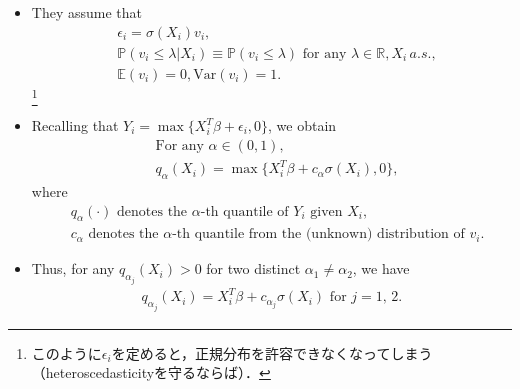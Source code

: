 \documentclass[xcolor=svgnames,dvipdfmx,cjk]{beamer}
\theoremstyle{example}
\def\Var{\text{Var}}
\def\E{\mathbb{E}}
\def\R{\mathbb{R}}
\def\P{\mathbb{P}}
\begin{document}
\begin{frame}
      \begin{itemize}
            \item They assume that 
                  \begin{align*}
                        &\epsilon_i = \sigma(X_i)v_i, \\
                        &\P(v_i \leq \lambda|X_i) \equiv \P(v_i \leq \lambda) \text{ for any } \lambda \in \R , X_i \, a.s.,\\
                        &\E(v_i)=0, \Var(v_i)=1. 
                  \end{align*}
                  \footnote{\tiny{このように$\epsilon_i$を定めると，正規分布を許容できなくなってしまう（heteroscedasticityを守るならば）．}}
            \item Recalling that $Y_i = \max\{X_i^T\beta + \epsilon_i, 0\}$, we obtain
                  \begin{align*}
                        &\text{For any } \alpha \in (0,1),\\
                        &q_{\alpha}(X_i) = \max\{X_i^T\beta + c_{\alpha}\sigma(X_i), 0\},
                  \end{align*}
                  where
                  \begin{align*}
                        & q_{\alpha}(\cdot) \text{ denotes the } \alpha \text{-th quantile of } Y_i \text{ given } X_i, \\
                        & c_{\alpha} \text{ denotes the } \alpha \text{-th quantile from the (unknown) distribution of } v_i.
                  \end{align*}
            \item Thus, for any $q_{\alpha_j}(X_i) > 0$ for two distinct $\alpha_1 \neq \alpha_2$, we have
                  \begin{align*}
                        q_{\alpha_j}(X_i) = X_i^T \beta + c_{\alpha_j} \sigma(X_i) \text{ for } j=1,\,2.
                  \end{align*}
      \end{itemize}
\end{frame}
\end{document}
